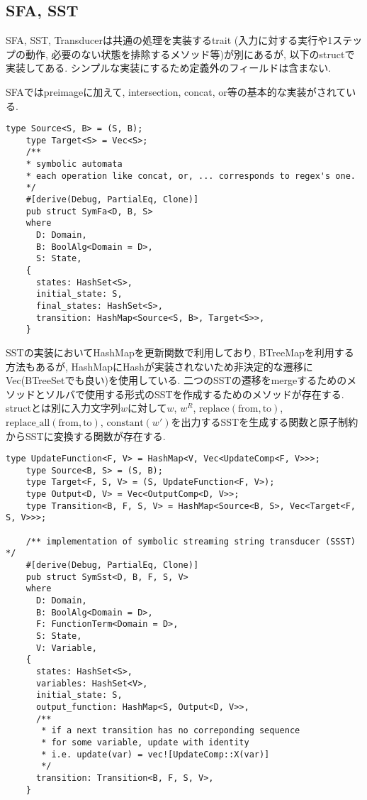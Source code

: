 \documentclass[uplatex,dvipdfmx,a4j]{jsreport}
\begin{document}
  \subsection{SFA, SST}
  SFA, SST, Transducerは共通の処理を実装するtrait
  (入力に対する実行や1ステップの動作, 必要のない状態を排除するメソッド等)が別にあるが,
  以下のstructで実装してある. シンプルな実装にするため定義外のフィールドは含まない.

  SFAではpreimageに加えて, intersection, concat, or等の基本的な実装がされている.
  \begin{lstlisting}[caption=SFA, label=sfa_impl]
    type Source<S, B> = (S, B);
    type Target<S> = Vec<S>;
    /**
    * symbolic automata
    * each operation like concat, or, ... corresponds to regex's one.
    */
    #[derive(Debug, PartialEq, Clone)]
    pub struct SymFa<D, B, S>
    where
      D: Domain,
      B: BoolAlg<Domain = D>,
      S: State,
    {
      states: HashSet<S>,
      initial_state: S,
      final_states: HashSet<S>,
      transition: HashMap<Source<S, B>, Target<S>>,
    }
  \end{lstlisting}

  SSTの実装においてHashMapを更新関数で利用しており, BTreeMapを利用する方法もあるが,
  HashMapにHashが実装されないため非決定的な遷移にVec(BTreeSetでも良い)を使用している.
  二つのSSTの遷移をmergeするためのメソッドとソルバで使用する形式のSSTを作成するためのメソッドが存在する.
  structとは別に入力文字列$w$に対して$w$, $w^R$,
  $\mbox{replace}(\mbox{from}, \mbox{to})$, $\mbox{replace\_all}(\mbox{from}, \mbox{to})$,
  $\mbox{constant}(w')$を出力するSSTを生成する関数と原子制約からSSTに変換する関数が存在する.
  \begin{lstlisting}[caption=SST, label=sst_impl]
    type UpdateFunction<F, V> = HashMap<V, Vec<UpdateComp<F, V>>>;
    type Source<B, S> = (S, B);
    type Target<F, S, V> = (S, UpdateFunction<F, V>);
    type Output<D, V> = Vec<OutputComp<D, V>>;
    type Transition<B, F, S, V> = HashMap<Source<B, S>, Vec<Target<F, S, V>>>;

    /** implementation of symbolic streaming string transducer (SSST) */
    #[derive(Debug, PartialEq, Clone)]
    pub struct SymSst<D, B, F, S, V>
    where
      D: Domain,
      B: BoolAlg<Domain = D>,
      F: FunctionTerm<Domain = D>,
      S: State,
      V: Variable,
    {
      states: HashSet<S>,
      variables: HashSet<V>,
      initial_state: S,
      output_function: HashMap<S, Output<D, V>>,
      /**
       * if a next transition has no correponding sequence
       * for some variable, update with identity
       * i.e. update(var) = vec![UpdateComp::X(var)]
       */
      transition: Transition<B, F, S, V>,
    }
  \end{lstlisting}
\end{document}
